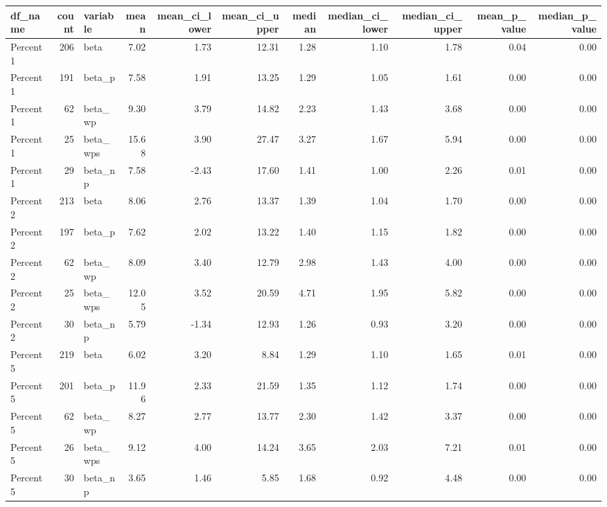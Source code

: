 \begin{tabular}{lrlrrrrrrrr}
  \hline
df\_name & count & variable & mean & mean\_ci\_lower & mean\_ci\_upper & median & median\_ci\_lower & median\_ci\_upper & mean\_p\_value & median\_p\_value \\ 
  \hline
  Percent1 & 206 & beta & 7.02 & 1.73 & 12.31 & 1.28 & 1.10 & 1.78 & 0.04 & 0.00 \\ 
  Percent1 & 191 & beta\_p & 7.58 & 1.91 & 13.25 & 1.29 & 1.05 & 1.61 & 0.00 & 0.00 \\ 
  Percent1 &  62 & beta\_wp & 9.30 & 3.79 & 14.82 & 2.23 & 1.43 & 3.68 & 0.00 & 0.00 \\ 
  Percent1 &  25 & beta\_wps & 15.68 & 3.90 & 27.47 & 3.27 & 1.67 & 5.94 & 0.00 & 0.00 \\ 
  Percent1 &  29 & beta\_np & 7.58 & -2.43 & 17.60 & 1.41 & 1.00 & 2.26 & 0.01 & 0.00 \\ 
  Percent2 & 213 & beta & 8.06 & 2.76 & 13.37 & 1.39 & 1.04 & 1.70 & 0.00 & 0.00 \\ 
  Percent2 & 197 & beta\_p & 7.62 & 2.02 & 13.22 & 1.40 & 1.15 & 1.82 & 0.00 & 0.00 \\ 
  Percent2 &  62 & beta\_wp & 8.09 & 3.40 & 12.79 & 2.98 & 1.43 & 4.00 & 0.00 & 0.00 \\ 
  Percent2 &  25 & beta\_wps & 12.05 & 3.52 & 20.59 & 4.71 & 1.95 & 5.82 & 0.00 & 0.00 \\ 
  Percent2 &  30 & beta\_np & 5.79 & -1.34 & 12.93 & 1.26 & 0.93 & 3.20 & 0.00 & 0.00 \\ 
  Percent5 & 219 & beta & 6.02 & 3.20 & 8.84 & 1.29 & 1.10 & 1.65 & 0.01 & 0.00 \\ 
  Percent5 & 201 & beta\_p & 11.96 & 2.33 & 21.59 & 1.35 & 1.12 & 1.74 & 0.00 & 0.00 \\ 
  Percent5 &  62 & beta\_wp & 8.27 & 2.77 & 13.77 & 2.30 & 1.42 & 3.37 & 0.00 & 0.00 \\ 
  Percent5 &  26 & beta\_wps & 9.12 & 4.00 & 14.24 & 3.65 & 2.03 & 7.21 & 0.01 & 0.00 \\ 
  Percent5 &  30 & beta\_np & 3.65 & 1.46 & 5.85 & 1.68 & 0.92 & 4.48 & 0.00 & 0.00 \\ 
   \hline
\end{tabular}
